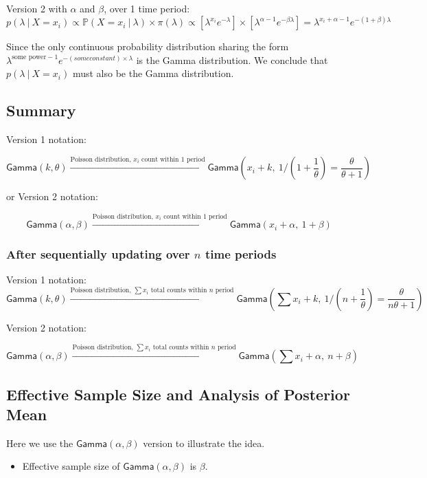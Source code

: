 \documentclass{article}
\begin{document}
Version 2 with $\alpha$ and $\beta$, over 1 time period:
$$ p(\lambda~|~X=x_i) \propto \mathbb{P}(X=x_i~|~\lambda)\times \pi(\lambda) \propto \left[\lambda^{x_i}e^{-\lambda}\right]\times\left[\lambda^{\alpha-1}e^{-\beta\lambda}\right]=\lambda^{x_i+\alpha-1}e^{-(1+\beta)\lambda} $$

Since the only continuous probability distribution sharing the form $\lambda^{\text{some power}-1}e^{-(some constant)\times \lambda}$ is the Gamma distribution. We conclude that $p(\lambda~|~X=x_i)$ must also be the Gamma distribution.

\subsection{Summary}

Version 1 notation:

$$ \textsf{Gamma}(k, \theta)\xrightarrow{\text{Poisson distribution, $x_i$ count within 1 period}} \textsf{Gamma}\left(x_i+k,\ 1/(1+\frac{1}{\theta})=\frac{\theta}{\theta+1}\right) $$

or Version 2 notation:

$$ \textsf{Gamma}(\alpha, \beta)\xrightarrow{\text{Poisson distribution, $x_i$ count within 1 period}} \textsf{Gamma}(x_i+\alpha,\ 1+\beta) $$

\subsubsection*{After sequentially updating over $n$ time periods}

Version 1 notation:
$$ \textsf{Gamma}(k, \theta)\xrightarrow{\text{Poisson distribution, $\sum x_i$ total counts within $n$ period}} \textsf{Gamma}\left(\sum x_i+k,\ 1/(n+\frac{1}{\theta})=\frac{\theta}{n\theta +1}\right) $$

Version 2 notation:

$$ \textsf{Gamma}(\alpha, \beta)\xrightarrow{\text{Poisson distribution, $\sum x_i$ total counts within $n$ period}} \textsf{Gamma}\left(\sum x_i+\alpha,\ n+\beta\right) $$

\subsection{Effective Sample Size and Analysis of Posterior Mean}

Here we use the $\textsf{Gamma}(\alpha, \beta)$ version to illustrate the idea.
\begin{itemize}
	\item Effective sample size of $\textsf{Gamma}(\alpha, \beta)$ is $\beta$.
\end{itemize}
\end{document}
